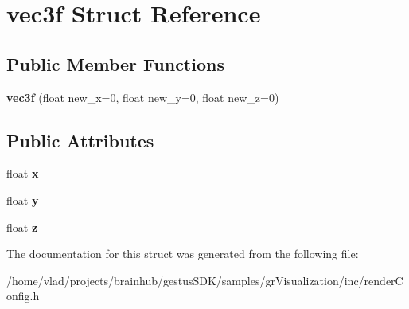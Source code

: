 \hypertarget{structvec3f}{}\section{vec3f Struct Reference}
\label{structvec3f}
\subsection*{Public Member Functions}
\begin{DoxyCompactItemize}
\item 
\mbox{\label{structvec3f_aa710d8381be4fe1a1541c28cab22c799}} 
{\bfseries vec3f} (float new\+\_\+x=0, float new\+\_\+y=0, float new\+\_\+z=0)
\end{DoxyCompactItemize}
\subsection*{Public Attributes}
\begin{DoxyCompactItemize}
\item 
\mbox{\label{structvec3f_a1417f8559817da7ea82a53f83f671552}} 
float {\bfseries x}
\item 
\mbox{\label{structvec3f_a9d9bd6e586efc6b2fdba9302e9414099}} 
float {\bfseries y}
\item 
\mbox{\label{structvec3f_a6294514a5a4322c1c957a1f09972c756}} 
float {\bfseries z}
\end{DoxyCompactItemize}


The documentation for this struct was generated from the following file\+:\begin{DoxyCompactItemize}
\item 
/home/vlad/projects/brainhub/gestus\+S\+D\+K/samples/gr\+Visualization/inc/render\+Config.\+h\end{DoxyCompactItemize}
